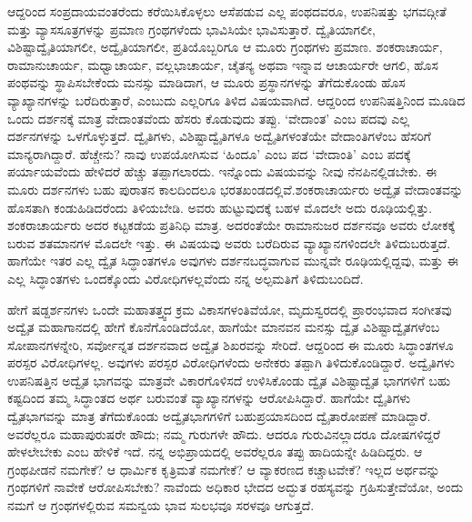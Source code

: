 ಆದ್ದರಿಂದ ಸಂಪ್ರದಾಯವಂತರೆಂದು ಕರೆಯಿಸಿಕೊಳ್ಳಲು ಆಸೆಪಡುವ ಎಲ್ಲ ಪಂಥದವರೂ, ಉಪನಿಷತ್ತು ಭಗವದ್ಗೀತೆ ಮತ್ತು ವ್ಯಾಸಸೂತ್ರಗಳನ್ನು ಪ್ರಮಾಣ ಗ್ರಂಥಗಳೆಂದು ಭಾವಿಸಿಯೇ ಭಾವಿಸುತ್ತಾರೆ. ದ್ವೈತಿಯಾಗಲೀ, ವಿಶಿಷ್ಟಾದ್ವೈತಿಯಾಗಲೀ, ಅದ್ವೈತಿಯಾಗಲೀ, ಪ್ರತಿಯೊಬ್ಬರಿಗೂ ಆ ಮೂರು ಗ್ರಂಥಗಳು ಪ್ರಮಾಣ. ಶಂಕರಾಚಾರ್ಯ, ರಾಮಾನುಚಾರ್ಯ, ಮಧ್ವಾಚಾರ್ಯ, ವಲ್ಲಭಾಚಾರ್ಯ, ಚೈತನ್ಯ ಅಥವಾ ಇನ್ನಾವ ಆಚಾರ್ಯರೇ ಆಗಲಿ, ಹೊಸ ಪಂಥವನ್ನು ಸ್ಥಾಪಿಸಬೇಕೆಂದು ಮನಸ್ಸು ಮಾಡಿದಾಗ, ಆ ಮೂರು ಪ್ರಸ್ಥಾನಗಳನ್ನು ತೆಗೆದುಕೊಂಡು ಹೊಸ ವ್ಯಾಖ್ಯಾನಗಳನ್ನು ಬರೆದಿರುತ್ತಾರೆ, ಎಂಬುದು ಎಲ್ಲರಿಗೂ ತಿಳಿದ ವಿಷಯವಾಗಿದೆ. ಆದ್ದರಿಂದ ಉಪನಿಷತ್ತಿನಿಂದ ಮೂಡಿದ ಒಂದು ದರ್ಶನಕ್ಕೆ ಮಾತ್ರ ವೇದಾಂತವೆಂದು ಹೆಸರು ಕೊಡುವುದು ತಪ್ಪು. ‘ವೇದಾಂತ’ ಎಂಬ ಪದವು ಎಲ್ಲ ದರ್ಶನಗಳನ್ನು ಒಳಗೊಳ್ಳುತ್ತದೆ. ದ್ವೈತಿಗಳು, ವಿಶಿಷ್ಟಾದ್ವೈತಿಗಳೂ ಅದ್ವೈತಿಗಳಂತೆಯೇ ವೇದಾಂತಿಗಳೆಂಬ ಹೆಸರಿಗೆ ಮಾನ್ಯರಾಗಿದ್ದಾರೆ. ಹೆಚ್ಚೇನು? ನಾವು ಉಪಯೋಗಿಸುವ ‘ಹಿಂದೂ’ ಎಂಬ ಪದ ‘ವೇದಾಂತಿ’ ಎಂಬ ಪದಕ್ಕೆ ಪರ್ಯಾಯವೆಂದು ಹೇಳಿದರೆ ಹೆಚ್ಚು ತಪ್ಪಾಗ\-ಲಾರದು. ಇನ್ನೊಂದು ವಿಷಯವನ್ನು ನೀವು ನೆನಪಿನಲ್ಲಿಡಬೇಕು. ಈ ಮೂರು ದರ್ಶನಗಳು ಬಹು ಪುರಾತನ ಕಾಲದಿಂದಲೂ ಭರತಖಂಡದಲ್ಲಿವೆ.\break ಶಂಕರಾಚಾರ್ಯರು ಅದ್ವೈತ ವೇದಾಂತವನ್ನು ಹೊಸತಾಗಿ ಕಂಡುಹಿಡಿದರೆಂದು ತಿಳಿಯಬೇಡಿ. ಅವರು ಹುಟ್ಟುವುದಕ್ಕೆ ಬಹಳ ಮೊದಲೇ ಅದು ರೂಢಿಯಲ್ಲಿತ್ತು. ಶಂಕರಾಚಾರ್ಯರು ಅದರ ಕಟ್ಟಕಡೆಯ ಪ್ರತಿನಿಧಿ ಮಾತ್ರ. ಅದರಂತೆಯೇ ರಾಮಾನುಜರ ದರ್ಶನವೂ ಅವರು ಲೋಕಕ್ಕೆ ಬರುವ ಶತಮಾನಗಳ ಮೊದಲೇ ಇತ್ತು. ಈ ವಿಷಯವು ಅವರು ಬರೆದಿರುವ ವ್ಯಾಖ್ಯಾನಗಳಿಂದಲೇ ತಿಳಿದುಬರುತ್ತದೆ. ಹಾಗೆಯೇ ಇತರ ಎಲ್ಲ ದ್ವೈತ ಸಿದ್ಧಾಂತಗಳೂ ಅವುಗಳು ದರ್ಶನಬದ್ಧವಾಗುವ ಮುನ್ನವೇ ರೂಢಿಯಲ್ಲಿದ್ದವು, ಮತ್ತು ಈ ಎಲ್ಲ ಸಿದ್ಧಾಂತಗಳು ಒಂದಕ್ಕೊಂದು ವಿರೋಧಿಗಳಲ್ಲವೆಂದು ನನ್ನ ಅಲ್ಪಮತಿಗೆ ತಿಳಿದುಬಂದಿದೆ.

ಹೇಗೆ ಷಡ್ದರ್ಶನಗಳು ಒಂದೇ ಮಹಾತತ್ತ್ವದ ಕ್ರಮ ವಿಕಾಸಗಳಂತಿವೆಯೋ, ಮೃದುಸ್ವರದಲ್ಲಿ ಪ್ರಾರಂಭವಾದ ಸಂಗೀತವು ಅದ್ವೈತ ಮಹಾಗಾನದಲ್ಲಿ ಹೇಗೆ ಕೊನೆಗೊಂಡಿದೆಯೋ, ಹಾಗೆಯೇ ಮಾನವನ ಮನಸ್ಸು ದ್ವೈತ ವಿಶಿಷ್ಟಾದ್ವೈತಗಳೆಂಬ ಸೋಪಾನಗಳನ್ನೇರಿ, ಸರ್ವೋನ್ನತ ದರ್ಶನವಾದ ಅದ್ವೈತ ಶಿಖರವನ್ನು ಸೇರಿದೆ. ಆದ್ದರಿಂದ ಈ ಮೂರು ಸಿದ್ಧಾಂತಗಳೂ ಪರಸ್ಪರ ವಿರೋಧಿಗಳಲ್ಲ. ಅವುಗಳು ಪರಸ್ಪರ ವಿರೋಧಿಗಳೆಂದು ಅನೇಕರು ತಪ್ಪಾಗಿ ತಿಳಿದುಕೊಂಡಿದ್ದಾರೆ. ಅದ್ವೈತಿಗಳು ಉಪನಿಷತ್ತಿನ ಅದ್ವೈತ ಭಾಗವನ್ನು ಮಾತ್ರವೇ ವಿಕಾರಗೊಳಿಸದೆ ಉಳಿಸಿಕೊಂಡು ದ್ವೈತ ವಿಶಿಷ್ಟಾದ್ವೈತ ಭಾಗಗಳಿಗೆ ಬಹು ಕಷ್ಟದಿಂದ ತಮ್ಮ ಸಿದ್ಧಾಂತದ ಅರ್ಥ ಬರುವಂತೆ ವ್ಯಾಖ್ಯಾನಗಳನ್ನು ಆರೋಪಿಸಿದ್ದಾರೆ. ಹಾಗೆಯೇ ದ್ವೈತಿಗಳು ದ್ವೈತಭಾಗವನ್ನು ಮಾತ್ರ ತೆಗೆದುಕೊಂಡು ಅದ್ವೈತಭಾಗಗಳಿಗೆ ಬಹುಪ್ರಯಾಸದಿಂದ ದ್ವೈತಾರೋಪಣೆ ಮಾಡಿದ್ದಾರೆ. ಅವರೆಲ್ಲರೂ ಮಹಾಪುರುಷರೇ ಹೌದು; ನಮ್ಮ ಗುರುಗಳೇ ಹೌದು. ಆದರೂ ಗುರುವಿ\-ನಲ್ಲಾದರೂ ದೋಷಗಳಿದ್ದರೆ ಹೇಳಲೇಬೇಕು ಎಂಬ ಹೇಳಿಕೆ ಇದೆ. ನನ್ನ ಅಭಿಪ್ರಾಯದಲ್ಲಿ ಅವರೆಲ್ಲರೂ ತಪ್ಪು ಹಾದಿಯನ್ನೇ ಹಿಡಿದಿದ್ದರು. ಆ ಗ್ರಂಥಪೀಡನೆ ನಮಗೇಕೆ? ಆ ಧಾರ್ಮಿಕ ಕೃತ್ರಿಮತೆ ನಮಗೇಕೆ? ಆ ವ್ಯಾಕರಣದ ಕಚ್ಚಾಟವೇಕೆ? ಇಲ್ಲದ ಅರ್ಥವನ್ನು ಗ್ರಂಥಗಳಿಗೆ ನಾವೇಕೆ ಆರೋಪಿಸಬೇಕು? ನಾವೆಂದು ಅಧಿಕಾರ ಭೇದದ ಅದ್ಭುತ ರಹಸ್ಯವನ್ನು ಗ್ರಹಿಸುತ್ತೇವೆಯೋ, ಅಂದು ನಮಗೆ ಆ ಗ್ರಂಥಗಳಲ್ಲಿರುವ ಸಮನ್ವಯ ಭಾವ ಸುಲಭವೂ ಸರಳವೂ ಆಗುತ್ತದೆ.

